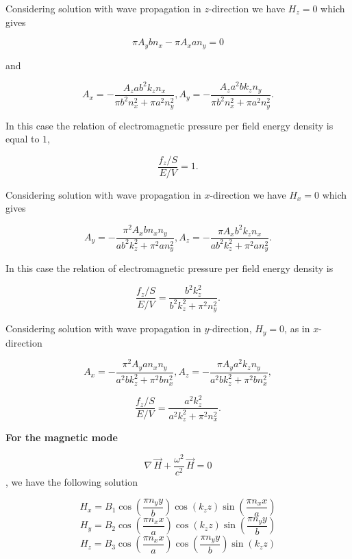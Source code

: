 \documentclass[twoside, 10pt]{article}
\begin{document}
\begin{multicols}{2}

    Considering solution with wave propagation in \(z\)-direction we have
\(H_z = 0\) which gives

    \[\pi A_{y} b n_{x} - \pi A_{x} a n_{y} = 0\]

    and

\[A_{x} = -\frac{A_{z} a b^{2} k_{z} n_{x}}{\pi b^{2} n_{x}^{2} + \pi a^{2} n_{y}^{2}},
A_{y} = -\frac{A_{z} a^{2} b k_{z} n_{y}}{\pi b^{2} n_{x}^{2} + \pi a^{2} n_{y}^{2}}.\]

    In this case the relation of electromagnetic pressure per field energy density
is equal to \(1\),

\begin{equation}\frac{f_z/S}{E/V} = 1.\end{equation}

    Considering solution with wave propagation in \(x\)-direction we have
\(H_x = 0\) which gives

    \[A_{y} = -\frac{\pi^{2} A_{x} b n_{x} n_{y}}{a b^{2} k_{z}^{2} + \pi^{2} a n_{y}^{2}},
A_{z} = -\frac{\pi A_{x} b^{2} k_{z} n_{x}}{a b^{2} k_{z}^{2} + \pi^{2} a n_{y}^{2}}.\]

    In this case the relation of electromagnetic pressure per field energy density is

\begin{equation}\frac{f_z/S}{E/V} = \frac{b^{2} k_{z}^{2}}{b^{2} k_{z}^{2} + \pi^{2} n_{y}^{2}}.\end{equation}

    Considering solution with wave propagation in \(y\)-direction,
\(H_y = 0\), as in \(x\)-direction

\[A_{x} = -\frac{\pi^{2} A_{y} a n_{x} n_{y}}{a^{2} b k_{z}^{2} + \pi^{2} b n_{x}^{2}},
A_{z} = -\frac{\pi A_{y} a^{2} k_{z} n_{y}}{a^{2} b k_{z}^{2} + \pi^{2} b n_{x}^{2}},\]

\begin{equation}\frac{f_z/S}{E/V} = \frac{a^{2} k_{z}^{2}}{a^{2} k_{z}^{2} + \pi^{2} n_{x}^{2}}.\end{equation}

    \textbf{For the magnetic mode}

\begin{equation}\nabla\,\vec{H} + \frac{\omega^2}{c^2}\,\vec{H} = 0\end{equation}, we have the
following solution

    \[H_{x} = B_{1} \cos\left(\frac{\pi n_{y} y}{b}\right) \cos\left(k_{z} z\right) \sin\left(\frac{\pi n_{x} x}{a}\right)\]
\[H_{y} = B_{2} \cos\left(\frac{\pi n_{x} x}{a}\right) \cos\left(k_{z} z\right) \sin\left(\frac{\pi n_{y} y}{b}\right)\]
\[H_{z} = B_{3} \cos\left(\frac{\pi n_{x} x}{a}\right) \cos\left(\frac{\pi n_{y} y}{b}\right) \sin\left(k_{z} z\right)\]


\end{multicols}
\end{document}
